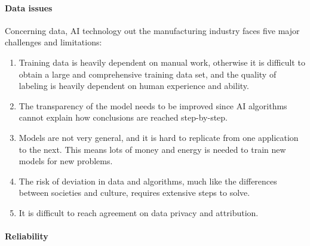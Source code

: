 \paragraph{Data issues}


Concerning data, AI technology out the manufacturing industry faces five major challenges and limitations: 

\begin{enumerate}
    \item Training data is heavily dependent on manual work, otherwise it is difficult to obtain a large and comprehensive training data set, and the quality of labeling is heavily dependent on human experience and ability.
    \item The transparency of the model needs
    to be improved since AI algorithms cannot explain how conclusions are reached step-by-step.
    \item Models are not very general, and it is hard to replicate from one application to the next. This means lots of money and energy is needed to train new models for new problems.
    \item The risk of deviation in data and algorithms, much
    like the differences between societies and culture, requires extensive steps to solve.
    \item It is difficult to reach agreement on data privacy and attribution.
\end{enumerate}

\paragraph{Reliability}


